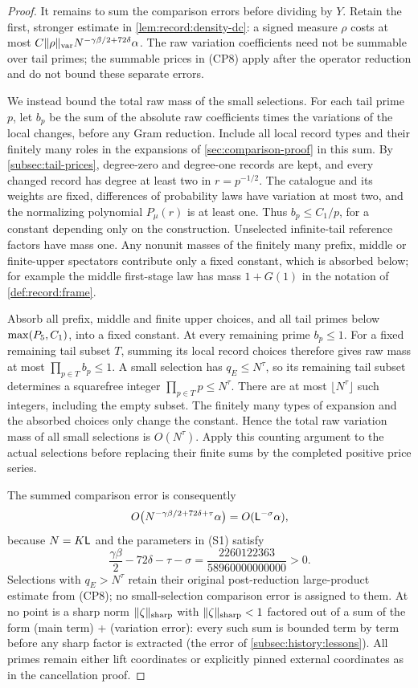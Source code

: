 \begin{proof}
It remains to sum the comparison errors before dividing by $Y$.
Retain the first, stronger estimate in
\cref{lem:record:density-dc}: a signed measure $\rho$ costs at most
$C\|\rho\|_{\rm var}N^{-\gamma\beta/2+72\delta}\alpha$.
The raw variation coefficients need not be summable over tail primes;
the summable prices in (CP8) apply after the operator reduction and do
not bound these separate errors.

We instead bound the total raw mass of the small selections.
For each tail prime $p$, let $b_p$ be the sum of the absolute raw
coefficients times the variations of the local changes, before any
Gram reduction. Include all local record types and their finitely many
roles in the expansions of \cref{sec:comparison-proof} in this sum.
By \cref{subsec:tail-prices}, degree-zero and degree-one records are
kept, and every changed record has degree at least two in
$r=p^{-1/2}$. The catalogue and its weights are fixed, differences of
probability laws have variation at most two, and the normalizing
polynomial $P_\mu(r)$ is at least one. Thus $b_p\le C_1/p$, for a
constant depending only on the construction. Unselected infinite-tail
reference factors have mass one. Any nonunit masses of the finitely
many prefix, middle or finite-upper spectators contribute only a fixed
constant, which is absorbed below; for example the middle first-stage
law has mass $1+G(1)$ in the notation of \cref{def:record:frame}.

Absorb all prefix, middle and finite upper choices, and all tail primes
below $\max(P_5,C_1)$, into a fixed constant. At every remaining
prime $b_p\le1$. For a fixed remaining tail subset $T$, summing its
local record choices therefore gives raw mass at most
$\prod_{p\in T}b_p\le1$. A small selection has $q_E\le N^\tau$,
so its remaining tail subset determines a squarefree integer
$\prod_{p\in T}p\le N^\tau$. There are at most $\lfloor N^\tau\rfloor$
such integers, including the empty subset. The finitely many types of
expansion and the absorbed choices only change the constant. Hence
the total raw variation mass of all small selections is $O(N^\tau)$.
Apply this counting argument to the actual selections before replacing
their finite sums by the completed positive price series.

The summed comparison error is consequently
\[
 O\bigl(N^{-\gamma\beta/2+72\delta+\tau}\alpha\bigr)
   =O(\mathsf L^{-\sigma}\alpha),
\]
because $N=K\mathsf L$ and the parameters in (S1) satisfy
\[
 \frac{\gamma\beta}{2}-72\delta-\tau-\sigma
 =\frac{2260122363}{58960000000000}>0.
\]
Selections with $q_E>N^\tau$ retain their original post-reduction
large-product estimate from (CP8); no small-selection comparison
error is assigned to them.
At no point is a sharp norm
$\|\zeta\|_{\rm sharp}$ with $\|\zeta\|_{\rm sharp}<1$
factored out of a sum of the form (main term) + (variation
error): every such sum is bounded term by term before any sharp
factor is extracted (the error of \cref{subsec:history:lessons}). All primes remain either lift coordinates
or explicitly pinned external coordinates as in the cancellation proof.
\end{proof}

